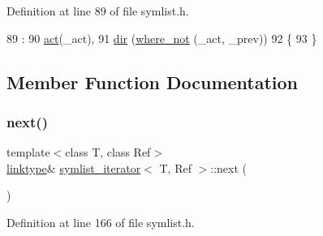 Definition at line 89 of file symlist.\+h.


\begin{DoxyCode}
89                                                     :
90     \mbox{\hyperlink{structsymlist__iterator_a1c7a0193ab85baa7705070975d841fc8}{act}}(\_act),
91     \mbox{\hyperlink{structsymlist__iterator_a8433e558ceb6b17b225414ef46b4a3e2}{dir}} (\mbox{\hyperlink{structsymlist__iterator_abeee238d3bfff557cdbf08a05b632fa8}{where\_not}} (\_act, \_prev))
92     \{
93     \}
\end{DoxyCode}


\subsection{Member Function Documentation}
\mbox{\label{structsymlist__iterator_ad363a9756ff599c960668320a93532ed}} 
\subsubsection{\texorpdfstring{next()}{next()}}
{\footnotesize\ttfamily template$<$class T, class Ref$>$ \\
\mbox{\hyperlink{structsymlist__iterator_ad9462ba519f8ca01ea64e04e25ee3750}{linktype}}\& \mbox{\hyperlink{structsymlist__iterator}{symlist\+\_\+iterator}}$<$ T, Ref $>$\+::next (\begin{DoxyParamCaption}{ }\end{DoxyParamCaption})\hspace{0.3cm}{\ttfamily [inline]}}



Definition at line 166 of file symlist.\+h.


